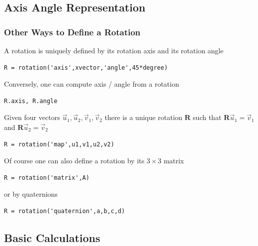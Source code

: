 \documentclass[compress]{beamer}
\begin{document}
\subsection*{Axis Angle Representation}
\label{sec:axis-angle-repr}

\begin{frame}[fragile]
  \frametitle{Other Ways to Define a Rotation}

  A rotation is uniquely defined by its rotation axis and its rotation angle

  \begin{lstlisting}[style=input]
R = rotation('axis',xvector,'angle',45*degree)
  \end{lstlisting}

  \pause
  \medskip

  Conversely, one can compute axis / angle from a rotation

  \begin{lstlisting}[style=input]
R.axis, R.angle
  \end{lstlisting}

  \pause
  \medskip

Given four vectors $\vec u_{1}, \vec u_{2}, \vec v_{1}, \vec v_{2}$ there is a
unique rotation $\mathbf R$ such that  $\mathbf R \vec u_{1} = \vec v_{1}$ and
$\mathbf R \vec u_{2} = \vec v_{2}$

\begin{lstlisting}[style=input]
R = rotation('map',u1,v1,u2,v2)
\end{lstlisting}

  \pause
  \medskip

Of course one can also define a rotation by its $3 \times 3$ matrix

  \begin{lstlisting}[style=input]
R = rotation('matrix',A)
  \end{lstlisting}

or by quaternions

  \begin{lstlisting}[style=input]
R = rotation('quaternion',a,b,c,d)
  \end{lstlisting}

\end{frame}

\subsection*{Basic Calculations}
\label{sec:euler-angles}
\end{document}
